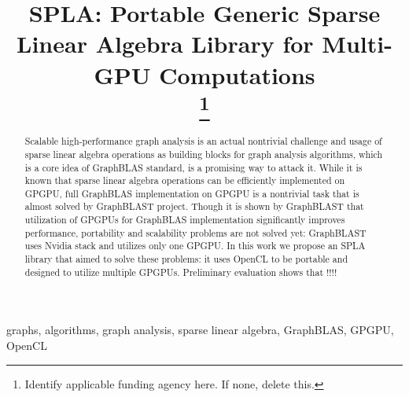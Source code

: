 \documentclass[conference]{IEEEtran}
\begin{document}
\title{SPLA: Portable Generic Sparse Linear Algebra Library for Multi-GPU Computations\\
\thanks{Identify applicable funding agency here. If none, delete this.}
}

\author{
\and
{}
\and
{}
}

\maketitle

\begin{abstract}
    Scalable high-performance graph analysis is an actual nontrivial challenge and usage of sparse linear algebra operations as building blocks for graph analysis algorithms, which is a core idea of GraphBLAS standard, is a promising way to attack it.
    While it is known that sparse linear algebra operations can be efficiently implemented on GPGPU, full GraphBLAS implementation on GPGPU is a nontrivial task that is almost solved by GraphBLAST project. Though it is shown by GraphBLAST that utilization of GPGPUs for GraphBLAS implementation significantly improves performance, portability and scalability problems are not solved yet: GraphBLAST uses Nvidia stack and utilizes only one GPGPU.
    In this work we propose an SPLA library that aimed to solve these problems: it uses OpenCL to be portable and designed to utilize multiple GPGPUs.
    Preliminary evaluation shows that !!!!
\end{abstract}

\begin{IEEEkeywords}
graphs, algorithms, graph analysis, sparse linear algebra, GraphBLAS, GPGPU, OpenCL
\end{IEEEkeywords}








\end{document}
